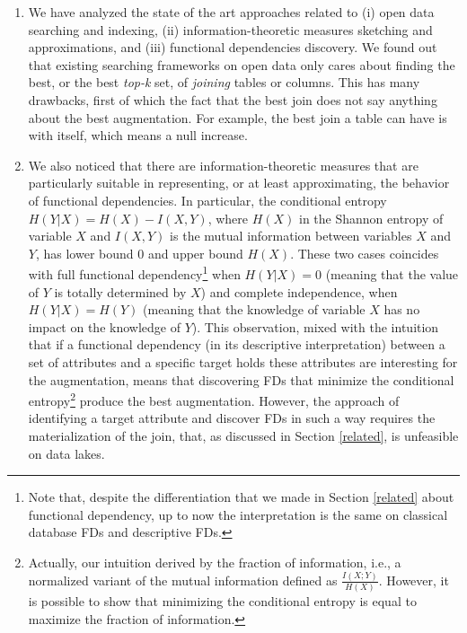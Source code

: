 \begin{enumerate}
    \item We have analyzed the state of the art approaches related to (i) open data searching and indexing, (ii) information-theoretic measures sketching and approximations, and (iii) functional dependencies discovery. We found out that existing searching frameworks on open data only cares about finding the best, or the best \textit{top-k} set, of \textit{joining} tables or columns. This has many drawbacks, first of which the fact that the best join does not say anything about the best augmentation. For example, the best join a table can have is with itself, which means a null increase.
    \item We also noticed that there are information-theoretic measures that are particularly suitable in representing, or at least approximating, the behavior of functional dependencies. In particular, the conditional entropy $H(Y|X) = H(X)-I(X,Y)$, where $H(X)$ in the Shannon entropy of variable $X$ and $I(X,Y)$ is the mutual information between variables $X$ and $Y$, has lower bound 0 and upper bound $H(X)$. These two cases coincides with full functional dependency\footnote{Note that, despite the differentiation that we made in Section \ref{related} about functional dependency, up to now the interpretation is the same on classical database FDs and descriptive FDs.} when $H(Y|X) = 0$ (meaning that the value of $Y$ is totally determined by $X$) and complete independence, when $H(Y|X) = H(Y)$ (meaning that the knowledge of variable $X$ has no impact on the knowledge of $Y$). This observation, mixed with the intuition that if a functional dependency (in its descriptive interpretation) between a set of attributes and a specific target holds these attributes are interesting for the augmentation, means that discovering FDs that minimize the conditional entropy\footnote{Actually, our intuition derived by the fraction of information, i.e., a normalized variant of the mutual information defined as $\frac{I(X;Y)}{H(X)}$. However, it is possible to show that minimizing the conditional entropy is equal to maximize the fraction of information.} produce the best augmentation. However, the approach of identifying a target attribute and discover FDs in such a way requires the materialization of the join, that, as discussed in Section \ref{related}, is unfeasible on data lakes.

\end{enumerate}
